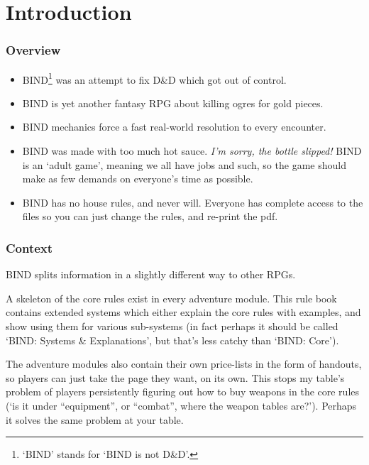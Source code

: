 \chapter*{Introduction}

\begin{multicols}{2}

\subsection*{Overview}

\begin{itemize}
  \item
  BIND\footnote{`BIND' stands for `BIND is not D\&D'.} was an attempt to fix D\&D which got out of control.
  \item
  BIND is yet another fantasy RPG about killing ogres for gold pieces.
  \item
  BIND mechanics force a fast real-world resolution to every encounter.
  \item
  \ifnum{}
    BIND was made with too much hot sauce.
    \emph{I'm sorry, the bottle slipped!}
  \else
  BIND is an `adult game', meaning we all have jobs and such, so the game should make as few demands on everyone's time as possible.
  \fi
  \item
  BIND has no house rules, and never will.
  Everyone has complete access to the files so you can just change the rules, and re-print the pdf.
\end{itemize}

\subsection*{Context}

BIND splits information in a slightly different way to other RPGs.

A skeleton of the core rules exist in every adventure module.
This rule book contains extended systems which either explain the core rules with examples, and show using them for various sub-systems (in fact perhaps it should be called `BIND: Systems \& Explanations', but that's less catchy than `BIND: Core').

The adventure modules also contain their own price-lists in the form of handouts, so players can just take the page they want, on its own.
This stops my table's problem of players persistently figuring out how to buy weapons in the core rules (`is it under ``equipment'', or ``combat'', where the weapon tables are?').
Perhaps it solves the same problem at your table.


\end{multicols}
